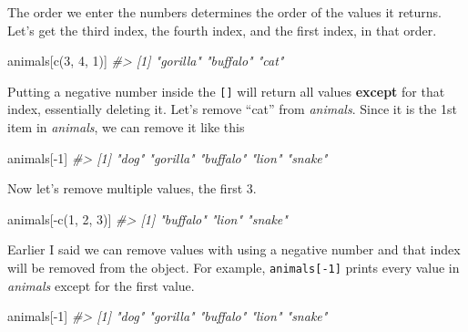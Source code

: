 \documentclass[
]{krantz}
\makeatletter
\newenvironment{Shaded}{\begin{snugshade}}{\end{snugshade}}
\newcommand{\CommentTok}[1]{\textcolor[rgb]{0.37,0.37,0.37}{\textit{#1}}}
\newcommand{\DecValTok}[1]{\textcolor[rgb]{0.06,0.06,0.06}{#1}}
\newcommand{\FunctionTok}[1]{\textcolor[rgb]{0,0,0}{#1}}
\newcommand{\NormalTok}[1]{#1}
\newcommand{\SpecialCharTok}[1]{\textcolor[rgb]{0,0,0}{#1}}
\newenvironment{kframe}{%
\medskip{}
\setlength{\fboxsep}{.8em}
 \def\at@end@of@kframe{}%
 \ifinner\ifhmode%
  \def\at@end@of@kframe{\end{minipage}}%
  \begin{minipage}{\columnwidth}%
 \fi\fi%
 \def\FrameCommand##1{\hskip\@totalleftmargin \hskip-\fboxsep
 \colorbox{shadecolor}{##1}\hskip-\fboxsep
     \hskip-\linewidth \hskip-\@totalleftmargin \hskip\columnwidth}%
 \MakeFramed {\advance\hsize-\width
   \@totalleftmargin\z@ \linewidth\hsize
   \@setminipage}}%
 {\par\unskip\endMakeFramed%
 \at@end@of@kframe}
\renewenvironment{Shaded}{\begin{kframe}}{\end{kframe}}
\makeatother
\begin{document}
The order we enter the numbers determines the order of the values it returns. Let's get the third index, the fourth index, and the first index, in that order.

\begin{Shaded}
\begin{Highlighting}[]
\NormalTok{animals[}\FunctionTok{c}\NormalTok{(}\DecValTok{3}\NormalTok{, }\DecValTok{4}\NormalTok{, }\DecValTok{1}\NormalTok{)]}
\CommentTok{\#\textgreater{} [1] "gorilla" "buffalo" "cat"}
\end{Highlighting}
\end{Shaded}

Putting a negative number inside the \texttt{{[}{]}} will return all values \textbf{except} for that index, essentially deleting it. Let's remove ``cat'' from \emph{animals}. Since it is the 1st item in \emph{animals}, we can remove it like this

\begin{Shaded}
\begin{Highlighting}[]
\NormalTok{animals[}\SpecialCharTok{{-}}\DecValTok{1}\NormalTok{]}
\CommentTok{\#\textgreater{} [1] "dog"     "gorilla" "buffalo" "lion"    "snake"}
\end{Highlighting}
\end{Shaded}

Now let's remove multiple values, the first 3.

\begin{Shaded}
\begin{Highlighting}[]
\NormalTok{animals[}\SpecialCharTok{{-}}\FunctionTok{c}\NormalTok{(}\DecValTok{1}\NormalTok{, }\DecValTok{2}\NormalTok{, }\DecValTok{3}\NormalTok{)]}
\CommentTok{\#\textgreater{} [1] "buffalo" "lion"    "snake"}
\end{Highlighting}
\end{Shaded}

Earlier I said we can remove values with using a negative number and that index will be removed from the object. For example, \texttt{animals{[}-1{]}} prints every value in \emph{animals} except for the first value.

\begin{Shaded}
\begin{Highlighting}[]
\NormalTok{animals[}\SpecialCharTok{{-}}\DecValTok{1}\NormalTok{]}
\CommentTok{\#\textgreater{} [1] "dog"     "gorilla" "buffalo" "lion"    "snake"}
\end{Highlighting}
\end{Shaded}
\end{document}
